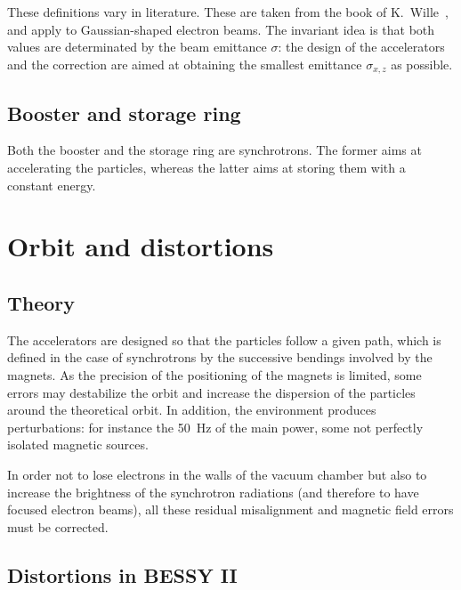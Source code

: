 These definitions vary in literature. These are taken from the book of K.~Wille~\cite{book:wille}, and apply to Gaussian-shaped electron beams. The invariant idea is that both values are determinated by the beam emittance $\sigma$: the design of the accelerators and the correction are aimed at obtaining the smallest emittance $\sigma_{x,z}$ as possible.
\subsection{Booster and storage ring}
Both the booster and the storage ring are synchrotrons. The former aims at accelerating the particles, whereas the latter aims at storing them with a constant energy. 

\section{Orbit and distortions}
\subsection{Theory}
The accelerators are designed so that the particles follow a given path, which is defined in the case of synchrotrons by the successive bendings involved by the magnets. As the precision of the positioning of the magnets is limited, some errors may destabilize the orbit and increase the dispersion of the particles around the theoretical orbit. In addition, the environment produces perturbations: for instance the 50~Hz of the main power, some not perfectly isolated magnetic sources.

In order not to lose electrons in the walls of the vacuum chamber but also to increase the brightness of the synchrotron radiations (and therefore to have focused electron beams), all these residual misalignment and magnetic field errors must be corrected.

\subsection{Distortions in BESSY II}


